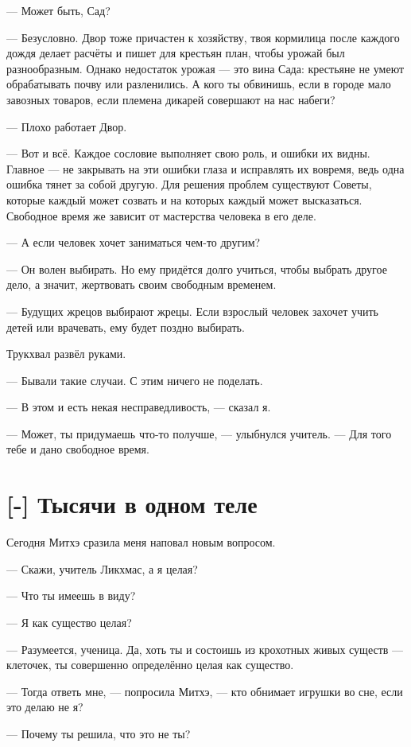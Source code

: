 --- Может быть, Сад?

--- Безусловно.
Двор тоже причастен к хозяйству, твоя кормилица после каждого дождя делает расчёты и пишет для крестьян план, чтобы урожай был разнообразным.
Однако недостаток урожая --- это вина Сада: крестьяне не умеют обрабатывать почву или разленились.
А кого ты обвинишь, если в городе мало завозных товаров, если племена дикарей совершают на нас набеги?

--- Плохо работает Двор.

--- Вот и всё.
Каждое сословие выполняет свою роль, и ошибки их видны.
Главное --- не закрывать на эти ошибки глаза и исправлять их вовремя, ведь одна ошибка тянет за собой другую.
Для решения проблем существуют Советы, которые каждый может созвать и на которых каждый может высказаться.
Свободное время же зависит от мастерства человека в его деле.

--- А если человек хочет заниматься чем-то другим?

--- Он волен выбирать.
Но ему придётся долго учиться, чтобы выбрать другое дело, а значит, жертвовать своим свободным временем.

--- Будущих жрецов выбирают жрецы.
Если взрослый человек захочет учить детей или врачевать, ему будет поздно выбирать.

Трукхвал развёл руками.

--- Бывали такие случаи.
С этим ничего не поделать.

--- В этом и есть некая несправедливость, --- сказал я.

--- Может, ты придумаешь что-то получше, --- улыбнулся учитель.
--- Для того тебе и дано свободное время.

\section{[-] Тысячи в одном теле}

Сегодня Митхэ сразила меня наповал новым вопросом.

--- Скажи, учитель Ликхмас, а я целая?

--- Что ты имеешь в виду?

--- Я как существо целая?

--- Разумеется, ученица.
Да, хоть ты и состоишь из крохотных живых существ --- клеточек, ты совершенно определённо целая как существо.

--- Тогда ответь мне, --- попросила Митхэ, --- кто обнимает игрушки во сне, если это делаю не я?

--- Почему ты решила, что это не ты?

